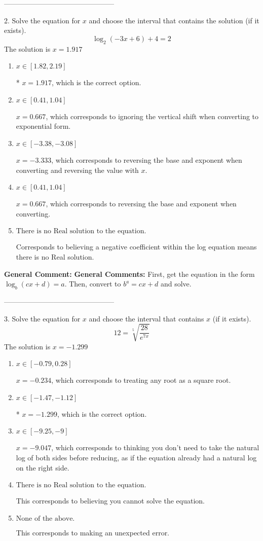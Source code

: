 \documentclass{extbook}[14pt]
\begin{document}
-----------------------------------------------

2. Solve the equation for $x$ and choose the interval that contains the solution (if it exists).
\[ \log_{2}{(-3x+6)}+4 = 2 \] 
The solution is $ x = 1.917 $ 

\begin{enumerate}[label=\Alph*.] 
\item $ x \in [1.82, 2.19] $ 

 * $x = 1.917$, which is the correct option. 
\item $ x \in [0.41, 1.04] $ 

 $x = 0.667$, which corresponds to ignoring the vertical shift when converting to exponential form. 
\item $ x \in [-3.38, -3.08] $ 

 $x = -3.333$, which corresponds to reversing the base and exponent when converting and reversing the value with $x$. 
\item $ x \in [0.41, 1.04] $ 

 $x = 0.667$, which corresponds to reversing the base and exponent when converting. 
\item $ \text{There is no Real solution to the equation.} $ 

 Corresponds to believing a negative coefficient within the log equation means there is no Real solution. 
\end{enumerate} 
 
\textbf{General Comment:} \textbf{General Comments:} First, get the equation in the form $\log_b{(cx+d)} = a$. Then, convert to $b^a = cx+d$ and solve. 

-----------------------------------------------

3.  Solve the equation for $x$ and choose the interval that contains $x$ (if it exists).
\[  12 = \sqrt[5]{\frac{28}{e^{7x}}} \] 
The solution is $ x = -1.299 $ 

\begin{enumerate}[label=\Alph*.] 
\item $ x \in [-0.79, 0.28] $ 

 $x = -0.234$, which corresponds to treating any root as a square root. 
\item $ x \in [-1.47, -1.12] $ 

 * $x = -1.299$, which is the correct option. 
\item $ x \in [-9.25, -9] $ 

 $x = -9.047$, which corresponds to thinking you don't need to take the natural log of both sides before reducing, as if the equation already had a natural log on the right side. 
\item $ \text{There is no Real solution to the equation.} $ 

 This corresponds to believing you cannot solve the equation. 
\item $ \text{None of the above.} $ 

 This corresponds to making an unexpected error. 
\end{enumerate} 
 
\end{document}
